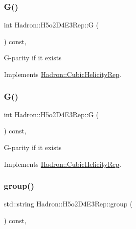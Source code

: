 \subsubsection{\texorpdfstring{G()}{G()}\hspace{0.1cm}{\footnotesize\ttfamily [1/2]}}
{\footnotesize\ttfamily int Hadron\+::\+H5o2\+D4\+E3\+Rep\+::G (\begin{DoxyParamCaption}{ }\end{DoxyParamCaption}) const\hspace{0.3cm}{\ttfamily [inline]}, {\ttfamily [virtual]}}

G-\/parity if it exists 

Implements \mbox{\hyperlink{structHadron_1_1CubicHelicityRep_a50689f42be1e6170aa8cf6ad0597018b}{Hadron\+::\+Cubic\+Helicity\+Rep}}.

\mbox{\label{structHadron_1_1H5o2D4E3Rep_a78e14d8a4ac2e04a138cceb78c763e3e}} 
\subsubsection{\texorpdfstring{G()}{G()}\hspace{0.1cm}{\footnotesize\ttfamily [2/2]}}
{\footnotesize\ttfamily int Hadron\+::\+H5o2\+D4\+E3\+Rep\+::G (\begin{DoxyParamCaption}{ }\end{DoxyParamCaption}) const\hspace{0.3cm}{\ttfamily [inline]}, {\ttfamily [virtual]}}

G-\/parity if it exists 

Implements \mbox{\hyperlink{structHadron_1_1CubicHelicityRep_a50689f42be1e6170aa8cf6ad0597018b}{Hadron\+::\+Cubic\+Helicity\+Rep}}.

\mbox{\label{structHadron_1_1H5o2D4E3Rep_a5761659c1554a5eadb627eb60ce49afa}} 
\subsubsection{\texorpdfstring{group()}{group()}\hspace{0.1cm}{\footnotesize\ttfamily [1/3]}}
{\footnotesize\ttfamily std\+::string Hadron\+::\+H5o2\+D4\+E3\+Rep\+::group (\begin{DoxyParamCaption}{ }\end{DoxyParamCaption}) const\hspace{0.3cm}{\ttfamily [inline]}, {\ttfamily [virtual]}}

